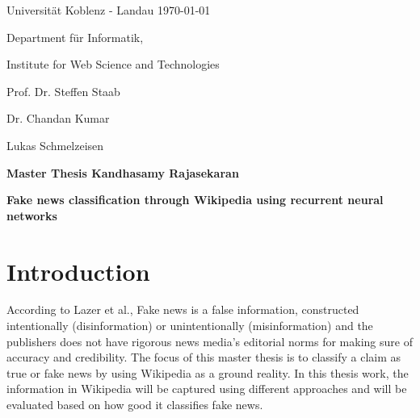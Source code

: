\documentclass[a4paper, 11pt]{article}
\newcommand{\myName}{Kandhasamy Rajasekaran}
\newcommand{\Title}{Fake news classification through Wikipedia using recurrent neural networks}
\newcommand{\subject}{Institute for Web Science and Technologies}
\newcommand{\expert}{Prof. Dr. Steffen Staab}%
\newcommand{\supervisor}{Dr. Chandan Kumar} %
\newcommand{\secondSupervisor}{Lukas Schmelzeisen} %
\newcommand{\type}{Master Thesis}
\begin{document}
Universit\"{a}t Koblenz - Landau \hfill \today

Department f\"{u}r Informatik,

\subject{}

\expert{}

\supervisor{}

\secondSupervisor{}

\begin{center}
	\large{\bf \type{}  \myName{}}

	\vspace*{0.5cm}

	\large{\bf \Title}
\end{center}

\setlength{\parskip}{1.5ex plus0.5ex minus 0.5ex}
\section{Introduction}
\frenchspacing

According to Lazer et al.\cite{Lazer1094}, Fake news is a false information, constructed intentionally (disinformation) or unintentionally (misinformation) and the publishers does not have rigorous news media's editorial norms for making sure of accuracy and credibility. The focus of this master thesis is to classify a claim as true or fake news by using Wikipedia as a ground reality. In this thesis work, the information in Wikipedia will be captured using different approaches and will be evaluated based on how good it classifies fake news.
\end{document}
